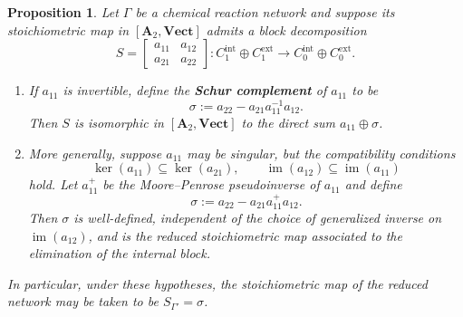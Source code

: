 \documentclass[10pt,a4paper]{amsart}
\newtheorem{proposition}{Proposition}
\newcommand{\define}[1]{\textbf{#1}}
\begin{document}
\begin{proposition}\label{prop:Schur}
    Let $\Gamma$ be a chemical reaction network and suppose its stoichiometric map in $[\mathbf{A}_2,\mathbf{Vect}]$ admits a block decomposition
    \[
    S =
    \begin{bmatrix}
     a_{11} & a_{12}\\
     a_{21} & a_{22}
    \end{bmatrix}
    :
    C_1^{\mathrm{int}} \oplus C_1^{\mathrm{ext}}
    \longrightarrow
    C_0^{\mathrm{int}} \oplus C_0^{\mathrm{ext}}.
    \]
    
    \begin{enumerate}
        \item If $a_{11}$ is invertible, define the \define{Schur complement} of $a_{11}$ to be
        \[
            \sigma := a_{22} - a_{21}a_{11}^{-1}a_{12}.
        \]
        Then $S$ is isomorphic in $[\mathbf{A}_2,\mathbf{Vect}]$ to the direct sum $a_{11} \oplus \sigma$.
    
        \item More generally, suppose $a_{11}$ may be singular, but the compatibility conditions
        \[
            \ker(a_{11}) \subseteq \ker(a_{21}),
            \qquad
            \operatorname{im}(a_{12}) \subseteq \operatorname{im}(a_{11})
        \]
        hold. Let $a_{11}^+$ be the Moore--Penrose pseudoinverse of $a_{11}$ and define
        \[
            \sigma := a_{22} - a_{21}a_{11}^+a_{12}.
        \]
        Then $\sigma$ is well-defined, independent of the choice of generalized inverse on $\operatorname{im}(a_{12})$, and is the reduced stoichiometric map associated to the elimination of the internal block.
    \end{enumerate}
    In particular, under these hypotheses, the stoichiometric map of the reduced network may be taken to be $S_{\Gamma'} = \sigma$.
\end{proposition}
\end{document}
